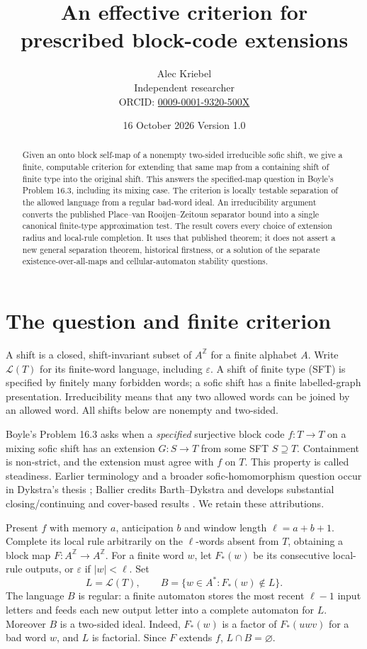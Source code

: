 \documentclass[11pt]{article}
\title{An effective criterion for prescribed block-code extensions}
\author{Alec Kriebel\\{\small Independent researcher}\\
{\small ORCID: \href{https://orcid.org/0009-0001-9320-500X}{0009-0001-9320-500X}}}
\date{16 October 2026 \quad Version 1.0}
\newcommand{\Lang}{\mathcal L}
\newcommand{\ZZ}{\mathbb Z}
\begin{document}
\maketitle
\begin{abstract}
Given an onto block self-map of a nonempty two-sided irreducible sofic
shift, we give a finite, computable criterion for extending that same
map from a containing shift of finite type into the original shift.
This answers the specified-map question in Boyle's Problem 16.3,
including its mixing case. The criterion is locally testable
separation of the allowed language from a regular bad-word ideal.
An irreducibility argument converts the published
Place--van Rooijen--Zeitoun separator bound into a single canonical
finite-type approximation test. The result covers every choice of
extension radius and local-rule completion. It uses that published
theorem; it does not assert a new general separation theorem,
historical firstness, or a solution of the separate
existence-over-all-maps and cellular-automaton stability questions.
\end{abstract}

\section{The question and finite criterion}
A shift is a closed, shift-invariant subset of $A^{\ZZ}$ for a finite
alphabet $A$. Write $\Lang(T)$ for its finite-word language, including
$\varepsilon$. A shift of finite type (SFT) is specified by finitely many
forbidden words; a sofic shift has a finite labelled-graph presentation.
Irreducibility means that any two allowed words can be joined by an
allowed word. All shifts below are nonempty and two-sided.

Boyle's Problem 16.3 \cite[Section 16]{Boyle} asks when a \emph{specified}
surjective block code $f:T\to T$ on a mixing sofic shift has an extension
$G:S\to T$ from some SFT $S\supseteq T$. Containment is non-strict, and
the extension must agree with $f$ on $T$. This property is called
steadiness. Earlier terminology and a broader sofic-homomorphism
question occur in Dykstra's thesis
\cite[Section 3.6, especially Problem 3.6.8]{Dykstra};
Ballier credits Barth--Dykstra \cite{BD} and develops substantial
closing/continuing and cover-based results
\cite[Sections 2--4]{Ballier}. We retain these attributions.

Present $f$ with memory $a$, anticipation $b$ and window length
$\ell=a+b+1$. Complete its local rule arbitrarily on the $\ell$-words
absent from $T$, obtaining a block map $F:A^{\ZZ}\to A^{\ZZ}$.
For a finite word $w$, let $F_*(w)$ be its consecutive local-rule outputs,
or $\varepsilon$ if $|w|<\ell$. Set
\[
 L=\Lang(T),\qquad B=\{w\in A^*:F_*(w)\notin L\}.
\]
The language $B$ is regular: a finite automaton stores the most recent
$\ell-1$ input letters and feeds each new output letter into a complete
automaton for $L$. Moreover $B$ is a two-sided ideal. Indeed,
$F_*(w)$ is a factor of $F_*(uwv)$ for a bad word $w$, and $L$ is
factorial. Since $F$ extends $f$, $L\cap B=\varnothing$.
\end{document}
